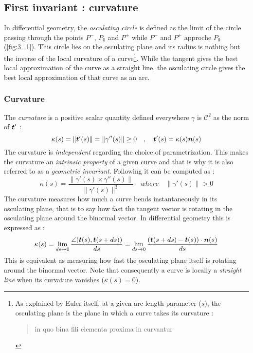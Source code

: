 \subsection{First invariant : curvature}\label{sec:curvature}
In differential geometry, the \emph{osculating circle} is defined as the limit of the circle passing through the points $P^-$, $P_0$ and $P^+$ while $P^-$ and $P^+$ approche $P_0$ (\cref{fig:3_1}). This circle lies on the osculating plane and its radius is nothing but the inverse of the local curvature of a curve\footnote{
As explained by Euler itself, at a given arc-length parameter ($s$), the osculating plane is the plane in which a curve takes its curvature :  \blockcquote[p.364]{Euler1775}{in quo bina fili elementa proxima in curvantur}.
}. While the tangent gives the best local approximation of the curve as a straight line, the osculating circle gives the best local approximation of that curve as an arc.

\subsubsection{Curvature}

The \emph{curvature} is a positive scalar quantity defined everywhere $\gamma$ is ${\mathcal{C}}^{2}$ as the norm of $\boldsymbol{t}'$ :
\begin{equation}
	\kappa(s) = \|\boldsymbol{t}'(s)\| = \|\gamma''(s)\| \ge 0 
	\quad,\quad
	\boldsymbol{t}'(s) = \kappa(s) \boldsymbol{n}(s)
\end{equation}
The curvature is \emph{independent} regarding the choice of parametrization. This makes the curvature an \emph{intrinsic property} of a given curve and that is why it is also referred to as a \emph{geometric invariant}. Following \cite[p.204]{Gray2006} it can be computed as :
\begin{equation}
	\kappa(s) = \frac{\|\gamma'(s) \times \gamma''(s) \|}{\|\gamma'(s)\|^3} 
	\quad where \quad
	\|\gamma'(s)\| > 0
\end{equation}
The curvature measures how much a curve bends instantaneously in its osculating plane, that is to say how fast the tangent vector is rotating in the osculating plane around the binormal vector. In differential geometry this is expressed as :
\begin{equation}
	\kappa(s)
	= \lim_{ds \to 0}\frac{\angle(\boldsymbol{t}(s),\boldsymbol{t}(s+ds))}{ds}
	= \lim_{ds \to 0}\frac{(\boldsymbol{t}(s+ds) - \boldsymbol{t}(s)) \cdot \boldsymbol{n}(s)}{ds}
\end{equation}
This is equivalent as measuring how fast the osculating plane itself is rotating around the binormal vector. Note that consequently a curve is locally a \emph{straight line} when its curvature vanishes ($\kappa(s)= 0$).

